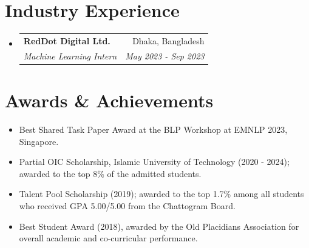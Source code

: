 \documentclass[letterpaper,11pt]{article}
\makeatletter
\newcommand{\cvEntry}[4]{\item
  \begin{tabular*}{\linewidth}{@{}l@{\extracolsep{\fill}}r@{}}
    \textbf{#1} & #2\\
    {\small\textit{#3}} & {\small\textit{#4}}
  \end{tabular*}}
\newenvironment{entries}{\vspace{-1.35pt}\begin{itemize}[leftmargin=14bp,label=\textbullet,itemsep=5.75pt,topsep=0pt,parsep=0pt]}{\end{itemize}}
\makeatother
\begin{document}
\section{Industry Experience}
\begin{entries}
  \cvEntry{RedDot Digital Ltd.}{Dhaka, Bangladesh}
    {Machine Learning Intern}{May 2023 - Sep 2023}
\end{entries}

\section{Awards \& Achievements}
\begin{itemize}[leftmargin=14bp,label=\textbullet,itemsep=5pt,topsep=0pt,parsep=0pt]
  \item Best Shared Task Paper Award at the BLP Workshop at EMNLP 2023, Singapore.
  \item Partial OIC Scholarship, Islamic University of Technology (2020 - 2024); awarded to the top 8\% of the admitted students.
  \item Talent Pool Scholarship (2019); awarded to the top 1.7\% among all students who received GPA 5.00/5.00 from the Chattogram Board.
  \item Best Student Award (2018), awarded by the Old Placidians Association for overall academic and co-curricular performance.
\end{itemize}
\end{document}
